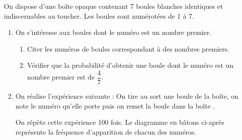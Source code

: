 \documentclass[exercice,a4]{thedocument}%
\begin{document}
%
\providecommand{\degres}{^\circ}%
On dispose d'une boîte opaque contenant 7 boules blanches identiques et indiscernables au toucher. Les boules sont numérotées de 1 à 7.

\begin{enumerate}
	\item On s'intéresse aux boules dont le numéro est un nombre premier.
	\begin{enumerate}
		\item Citer les numéros de boules correspondant à des nombres premiers.
		\item Vérifier que la probabilité d'obtenir une boule dont le numéro est un nombre premier est de $\dfrac{4}{7}$.
	\end{enumerate}
	\item On réalise l'expérience suivante : \og On tire au sort une boule de la boîte, on note le numéro qu'elle porte puis on remet la boule dans la boîte \fg.
	
	On répète cette expérience 100 fois. Le diagramme en bâtons ci-après représente la fréquence d'apparition de chacun des numéros.

\begin{center}
	\end{center}


\end{enumerate}
\end{document}
